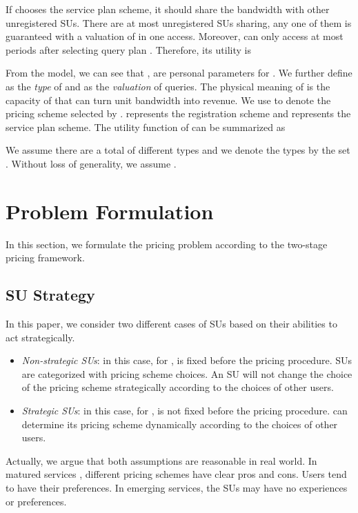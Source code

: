 \documentclass[journal]{IEEEtran}
\begin{document}
If  chooses the service plan scheme, it should share the bandwidth with other unregistered SUs. There are at most  unregistered SUs sharing, any one of them is guaranteed with a valuation of  in one access.  Moreover,  can only access at most  periods after selecting query plan . Therefore, its utility is


From the model, we can see that ,  are personal parameters for . We further define  as the \emph{type} of  and  as the \emph{valuation} of  queries. The physical meaning of  is the capacity of  that can turn unit bandwidth into revenue. We use  to denote the pricing scheme selected by .  represents the registration scheme and  represents the service plan scheme. The utility function of  can be summarized as


We assume there are a total of  different types and we denote the types by the set . Without loss of generality, we assume .

\section{Problem Formulation}
\label{sec:formulation}

In this section, we formulate the pricing problem according to the two-stage pricing framework.

\subsection{SU Strategy}

In this paper, we consider two different cases of SUs based on their abilities to act strategically.
\begin{itemize}
  \item \emph{Non-strategic SUs}: in this case, for ,  is fixed before the pricing procedure. SUs are categorized with pricing scheme choices. An SU will not change the choice of the pricing scheme strategically according to the choices of other users.
  \item \emph{Strategic SUs}: in this case, for ,  is not fixed before the pricing procedure.  can determine its pricing scheme dynamically according to the choices of other users.
\end{itemize}

Actually, we argue that both assumptions are reasonable in real world. In matured services \cite{icdcs12segmentation}, different pricing schemes have clear pros and cons. Users tend to have their preferences. In emerging services, the SUs may have no experiences or preferences.
\end{document}
